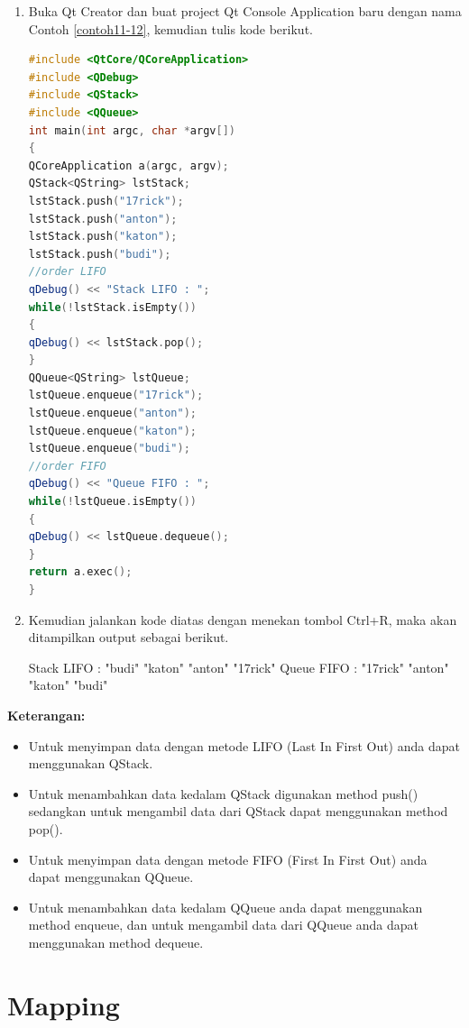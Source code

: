 \begin{enumerate}

\item
  Buka Qt Creator dan buat project Qt Console Application baru dengan
  nama Contoh \ref{contoh11-12}, kemudian tulis kode berikut.

\begin{lstlisting}[language=c++, caption=Menggunakan Stack dan Queue, label=contoh11-12]
#include <QtCore/QCoreApplication>
#include <QDebug>
#include <QStack>
#include <QQueue>
int main(int argc, char *argv[])
{
QCoreApplication a(argc, argv);
QStack<QString> lstStack;
lstStack.push("17rick");
lstStack.push("anton");
lstStack.push("katon");
lstStack.push("budi");
//order LIFO
qDebug() << "Stack LIFO : ";
while(!lstStack.isEmpty())
{
qDebug() << lstStack.pop();
}
QQueue<QString> lstQueue;
lstQueue.enqueue("17rick");
lstQueue.enqueue("anton");
lstQueue.enqueue("katon");
lstQueue.enqueue("budi");
//order FIFO
qDebug() << "Queue FIFO : ";
while(!lstQueue.isEmpty())
{
qDebug() << lstQueue.dequeue();
}
return a.exec();
}
\end{lstlisting}
\item
  Kemudian jalankan kode diatas dengan menekan tombol Ctrl+R, maka akan
  ditampilkan output sebagai berikut.
\begin{lcverbatim}
Stack LIFO : 
"budi"
"katon"
"anton"
"17rick"
Queue FIFO : 
"17rick"
"anton"
"katon"
"budi"
\end{lcverbatim}
\end{enumerate}

\textbf{Keterangan:}

\begin{itemize}

\item
  Untuk menyimpan data dengan metode LIFO (Last In First Out) anda dapat
  menggunakan QStack.
\item
  Untuk menambahkan data kedalam QStack digunakan method push()
  sedangkan untuk mengambil data dari QStack dapat menggunakan method
  pop().
\item
  Untuk menyimpan data dengan metode FIFO (First In First Out) anda
  dapat menggunakan QQueue.
\item
  Untuk menambahkan data kedalam QQueue anda dapat menggunakan method
  enqueue, dan untuk mengambil data dari QQueue anda dapat menggunakan
  method dequeue.
\end{itemize}

\section{Mapping}\label{mapping}

